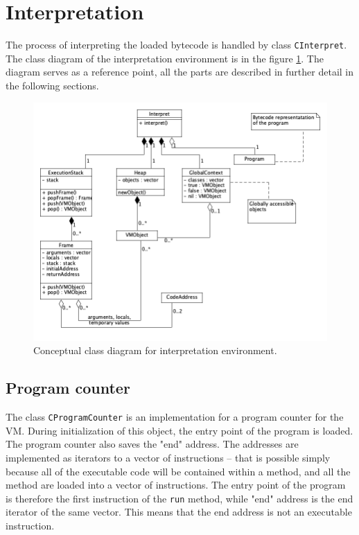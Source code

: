 \documentclass[thesis=M,english]{FITthesis}[2019/12/23]
\begin{document}
\section{Interpretation}
The process of interpreting the loaded bytecode is handled by class \texttt{CInterpret}. The class diagram of the interpretation environment is
in the figure \ref{fig:interpret_classDiagram}. The diagram serves as a reference point, all the parts are described in further detail in the
following sections.

\begin{figure}[h!]
	\centering
	\includegraphics[width=\textwidth]{media/interpret_class.png}
	\caption{Conceptual class diagram for interpretation environment.}
	\label{fig:interpret_classDiagram}
\end{figure}

\subsection{Program counter}
The class \texttt{CProgramCounter} is an implementation for a program counter for the VM. During initialization of this object, the entry point of the program is loaded.
The program counter also saves the "end" address. The addresses are implemented as iterators to a vector of instructions -- that is possible simply because all of the
executable code will be contained within a method, and all the method are loaded into a vector of instructions. The entry point of the program is therefore the first
instruction of the \texttt{run} method, while "end" address is the end iterator of the same vector. This means that the end address is not an executable instruction.
\end{document}

